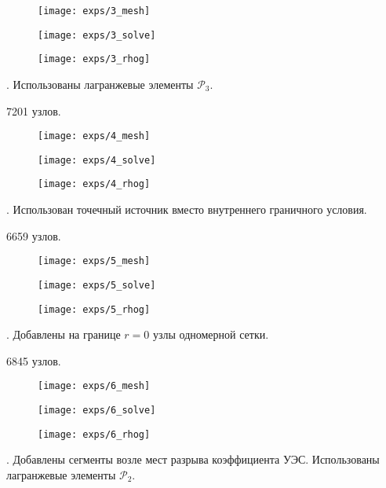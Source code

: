 \begin{figure}[H]
  \texttt{[image: exps/3\_mesh]}
\end{figure}
\begin{figure}[H]
  \texttt{[image: exps/3\_solve]}
\end{figure}
\begin{figure}[H]
  \texttt{[image: exps/3\_rhog]}
\end{figure}

 \theexp.
Использованы лагранжевые элементы ${\mathcal{P}_3}$.

7201 узлов.

\begin{figure}[H]
  \texttt{[image: exps/4\_mesh]}
\end{figure}
\begin{figure}[H]
  \texttt{[image: exps/4\_solve]}
\end{figure}
\begin{figure}[H]
  \texttt{[image: exps/4\_rhog]}
\end{figure}

 \theexp \label{optimal}.
Использован точечный источник вместо внутреннего граничного условия.

6659 узлов.

\begin{figure}[H]
  \texttt{[image: exps/5\_mesh]}
\end{figure}
\begin{figure}[H]
  \texttt{[image: exps/5\_solve]}
\end{figure}
\begin{figure}[H]
  \texttt{[image: exps/5\_rhog]}
\end{figure}

 \theexp.
Добавлены на границе ${r = 0}$ узлы одномерной сетки.

6845 узлов.

\begin{figure}[H]
  \texttt{[image: exps/6\_mesh]}
\end{figure}
\begin{figure}[H]
  \texttt{[image: exps/6\_solve]}
\end{figure}
\begin{figure}[H]
  \texttt{[image: exps/6\_rhog]}
\end{figure}

 \theexp.
Добавлены сегменты возле мест разрыва коэффициента УЭС. Использованы лагранжевые элементы ${\mathcal{P}_2}$.

